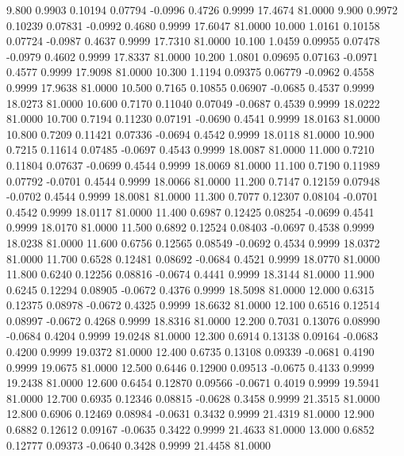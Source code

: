    9.800   0.9903   0.10194   0.07794  -0.0996   0.4726   0.9999  17.4674  81.0000
   9.900   0.9972   0.10239   0.07831  -0.0992   0.4680   0.9999  17.6047  81.0000
  10.000   1.0161   0.10158   0.07724  -0.0987   0.4637   0.9999  17.7310  81.0000
  10.100   1.0459   0.09955   0.07478  -0.0979   0.4602   0.9999  17.8337  81.0000
  10.200   1.0801   0.09695   0.07163  -0.0971   0.4577   0.9999  17.9098  81.0000
  10.300   1.1194   0.09375   0.06779  -0.0962   0.4558   0.9999  17.9638  81.0000
  10.500   0.7165   0.10855   0.06907  -0.0685   0.4537   0.9999  18.0273  81.0000
  10.600   0.7170   0.11040   0.07049  -0.0687   0.4539   0.9999  18.0222  81.0000
  10.700   0.7194   0.11230   0.07191  -0.0690   0.4541   0.9999  18.0163  81.0000
  10.800   0.7209   0.11421   0.07336  -0.0694   0.4542   0.9999  18.0118  81.0000
  10.900   0.7215   0.11614   0.07485  -0.0697   0.4543   0.9999  18.0087  81.0000
  11.000   0.7210   0.11804   0.07637  -0.0699   0.4544   0.9999  18.0069  81.0000
  11.100   0.7190   0.11989   0.07792  -0.0701   0.4544   0.9999  18.0066  81.0000
  11.200   0.7147   0.12159   0.07948  -0.0702   0.4544   0.9999  18.0081  81.0000
  11.300   0.7077   0.12307   0.08104  -0.0701   0.4542   0.9999  18.0117  81.0000
  11.400   0.6987   0.12425   0.08254  -0.0699   0.4541   0.9999  18.0170  81.0000
  11.500   0.6892   0.12524   0.08403  -0.0697   0.4538   0.9999  18.0238  81.0000
  11.600   0.6756   0.12565   0.08549  -0.0692   0.4534   0.9999  18.0372  81.0000
  11.700   0.6528   0.12481   0.08692  -0.0684   0.4521   0.9999  18.0770  81.0000
  11.800   0.6240   0.12256   0.08816  -0.0674   0.4441   0.9999  18.3144  81.0000
  11.900   0.6245   0.12294   0.08905  -0.0672   0.4376   0.9999  18.5098  81.0000
  12.000   0.6315   0.12375   0.08978  -0.0672   0.4325   0.9999  18.6632  81.0000
  12.100   0.6516   0.12514   0.08997  -0.0672   0.4268   0.9999  18.8316  81.0000
  12.200   0.7031   0.13076   0.08990  -0.0684   0.4204   0.9999  19.0248  81.0000
  12.300   0.6914   0.13138   0.09164  -0.0683   0.4200   0.9999  19.0372  81.0000
  12.400   0.6735   0.13108   0.09339  -0.0681   0.4190   0.9999  19.0675  81.0000
  12.500   0.6446   0.12900   0.09513  -0.0675   0.4133   0.9999  19.2438  81.0000
  12.600   0.6454   0.12870   0.09566  -0.0671   0.4019   0.9999  19.5941  81.0000
  12.700   0.6935   0.12346   0.08815  -0.0628   0.3458   0.9999  21.3515  81.0000
  12.800   0.6906   0.12469   0.08984  -0.0631   0.3432   0.9999  21.4319  81.0000
  12.900   0.6882   0.12612   0.09167  -0.0635   0.3422   0.9999  21.4633  81.0000
  13.000   0.6852   0.12777   0.09373  -0.0640   0.3428   0.9999  21.4458  81.0000

